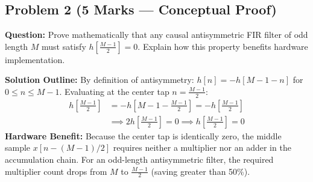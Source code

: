 \documentclass[11pt,a4paper]{article}
\begin{document}
\subsection{Problem 2 (5 Marks — Conceptual Proof)}
\textbf{Question:}
Prove mathematically that any causal antisymmetric FIR filter of odd length $M$ must satisfy $h\left[\frac{M-1}{2}\right] = 0$. Explain how this property benefits hardware implementation.

\vspace{0.2cm}
\noindent\textbf{Solution Outline:}
By definition of antisymmetry: $h[n] = -h[M-1-n]$ for $0 \le n \le M-1$. 
Evaluating at the center tap $n = \frac{M-1}{2}$:
\begin{align*}
h\left[\frac{M-1}{2}\right] &= -h\left[M - 1 - \frac{M-1}{2}\right] = -h\left[\frac{M-1}{2}\right] \\
&\implies 2h\left[\frac{M-1}{2}\right] = 0 \implies h\left[\frac{M-1}{2}\right] = 0
\end{align*}
\textbf{Hardware Benefit:} Because the center tap is identically zero, the middle sample $x[n - (M-1)/2]$ requires neither a multiplier nor an adder in the accumulation chain. For an odd-length antisymmetric filter, the required multiplier count drops from $M$ to $\frac{M-1}{2}$ (saving greater than 50\%).
\end{document}
